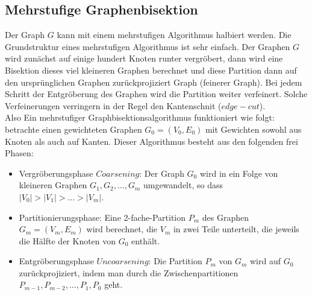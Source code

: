 \documentclass[runningheads]{llncs}
\begin{document}
\subsection{Mehrstufige Graphenbisektion}
Der Graph $G$ kann mit einem mehrstufigen Algorithmus halbiert werden. Die Grundstruktur eines mehrstufigen Algorithmus ist sehr einfach. Der
Graphen $G$ wird zunächst auf einige hundert Knoten runter vergröbert, dann wird eine Bisektion dieses viel kleineren Graphen berechnet und diese Partition dann auf den ursprünglichen Graphen zurückprojiziert Graph (feinerer Graph). Bei jedem Schritt der Entgröberung des Graphen wird die Partition weiter verfeinert. Solche Verfeinerungen verringern in der Regel den Kantenschnit ($edge-cut$).\\
Also Ein mehrstufiger Graphbisektionsalgorithmus funktioniert wie folgt: betrachte einen gewichteten Graphen $G_0 = (V_0, E_0)$ mit Gewichten sowohl aus Knoten als auch auf Kanten. Dieser Algorithmus besteht aus den folgenden frei Phasen:
\begin{itemize}
	\item Vergröberungsphase $Coarsening$: Der Graph $G_0$ wird in ein Folge von kleineren Graphen $G_1, G_2, \ldots, G_m$ umgewandelt, so dass $\lvert V_0 \lvert > \lvert V_1 \lvert > \ldots > \lvert V_m \lvert.$
	\item Partitionierungsphase: Eine 2-fache-Partition $P_m$ des Graphen $G_m = (V_m, E_m)$ wird berechnet, die $V_m$ in zwei Teile unterteilt, die jeweils die Hälfte der Knoten von $G_0$ enthält. 
	\item Entgröberungsphase $Uncoarsening$: Die Partition $P_m$ von $G_m$ wird auf $G_0$ zurückprojiziert, indem man durch die Zwischenpartitionen $P_{m-1}, P_{m-2}, \ldots, P_1, P_0$ geht.  
\end{itemize} 
\setcounter{secnumdepth}{3}
\end{document}
